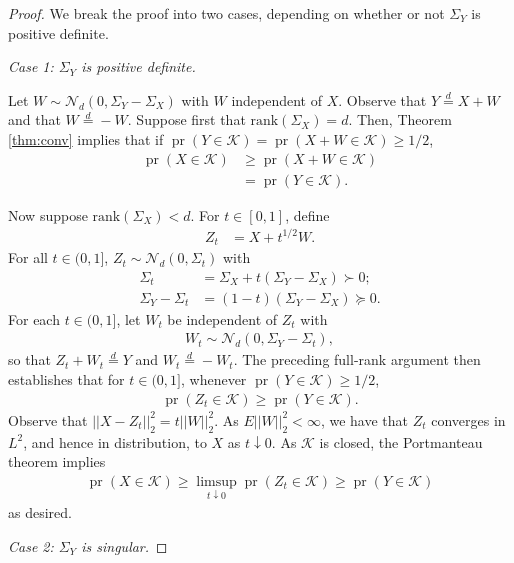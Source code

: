 \documentclass[10pt,a4paper]{amsart}
\def\pr{{\operatorname{pr}}}
\begin{document}
\begin{proof}
We break the proof into two cases, depending on whether or not $\Sigma_Y$ is positive definite.

\medskip
\noindent\textit{Case 1: $\Sigma_Y$ is positive definite.}

Let $W \sim \mathcal{N}_d(0, \Sigma_Y-\Sigma_X)$ with $W$ independent of $X$. Observe that $Y \overset{d}{=}X+W$ and that $W\overset{d}{=} -W$.
Suppose first that $\text{rank}(\Sigma_X) = d$. Then, Theorem \ref{thm:conv} implies that if $\pr(Y\in \mathcal{K}) = \pr(X+W \in \mathcal{K})\geq 1/2$, 
\begin{align*} \pr(X\in \mathcal{K})&\geq \pr(X+W\in \mathcal{K})\\ &= \pr(Y\in \mathcal{K}).\end{align*}

Now suppose $\text{rank}(\Sigma_X) < d$. For $t \in [0,1]$, define 
\begin{align*} Z_t &= X + t^{1/2}W.
\end{align*} For all $t\in(0,1]$, $Z_t \sim \mathcal{N}_d(0,\Sigma_t)$ with 
\begin{align*} \Sigma_t &= \Sigma_X+t(\Sigma_Y-\Sigma_X) \succ 0;\\ \Sigma_Y-\Sigma_t &= (1-t)(\Sigma_Y-\Sigma_X) \succeq 0.\end{align*} For each $t\in (0,1]$, let $W_t$ be independent of $Z_t$ with 
\begin{align*}W_t \sim \mathcal{N}_d(0, \Sigma_Y-\Sigma_t),
\end{align*}so that $Z_t+W_t \overset{d}{=} Y$ and $W_t \overset{d}{=} -W_t$. The preceding full-rank argument then establishes that for $t \in (0,1]$, whenever $\pr(Y\in \mathcal{K})\geq 1/2$,\begin{align*}\pr(Z_t \in \mathcal{K}) \geq \pr(Y\in\mathcal{K}).\end{align*}Observe that $||X - Z_t||_2^2 = t||W||_2^2$. As $E||W||^2_2 < \infty$, we have that $Z_t$ converges in $L^2$, and hence in distribution, to $X$ as $t\downarrow 0$. As $\mathcal{K}$ is closed, the Portmanteau theorem implies 
\begin{align*}\operatorname{pr}(X\in \mathcal{K}) \geq \limsup_{t\downarrow 0}\operatorname{pr}(Z_t \in \mathcal{K})\geq \operatorname{pr}(Y\in \mathcal{K})\end{align*} as desired.

\medskip
\noindent\textit{Case 2: $\Sigma_Y$ is singular.}


\end{proof}
\end{document}
